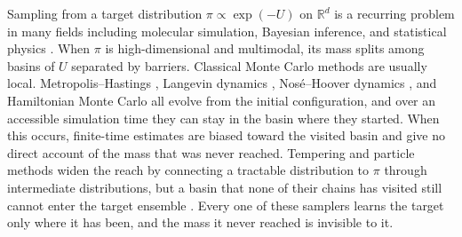 \documentclass{article}
\begin{document}
Sampling from a target distribution $\pi \propto \exp(-U)$ on $\mathbb R^d$ is a recurring problem in many fields including molecular simulation, Bayesian inference, and statistical physics \citep{frenkel2002understanding,robert2004monte,landau2014guide}. When $\pi$ is high-dimensional and multimodal, its mass splits among basins of $U$ separated by barriers. Classical Monte Carlo methods are usually local. Metropolis--Hastings \citep{metropolis1953equation,hastings1970monte}, Langevin dynamics \citep{langevin1908theorie,leimkuhler2015molecular}, Nos{\'e}--Hoover dynamics \citep{nose1984unified,hoover1985canonical}, and Hamiltonian Monte Carlo \citep{duane1987hybrid} all evolve from the initial configuration, and over an accessible simulation time they can stay in the basin where they started. When this occurs, finite-time estimates are biased toward the visited basin and give no direct account of the mass that was never reached. Tempering and particle methods widen the reach by connecting a tractable distribution to $\pi$ through intermediate distributions, but a basin that none of their chains has visited still cannot enter the target ensemble \citep{woodard2009conditions,chehab2024provable}. Every one of these samplers learns the target only where it has been, and the mass it never reached is invisible to it.
\end{document}

